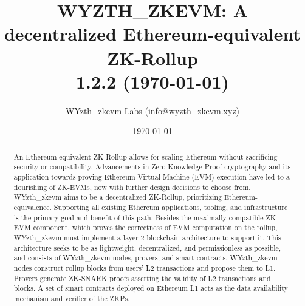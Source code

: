 \documentclass[9pt,oneside]{amsart}
\date{\today}
\title[WYZTH_ZKEVM: A decentralized Ethereum-equivalent ZK-Rollup\\ \smaller
\textbf{{1.2.2}}]{WYZTH_ZKEVM: A decentralized Ethereum-equivalent ZK-Rollup \\ \smaller \textbf{{1.2.2 (\today)}}}
\author{WYzth_zkevm Labs (info@wyzth_zkevm.xyz)}
\begin{document}
\pagecolor{pagecolor}

\begin{abstract}
An Ethereum-equivalent ZK-Rollup allows for scaling Ethereum without sacrificing security or compatibility. Advancements in Zero-Knowledge Proof cryptography and its application towards proving Ethereum Virtual Machine (EVM) execution have led to a flourishing of ZK-EVMs, now with further design decisions to choose from. WYzth_zkevm aims to be a decentralized ZK-Rollup, prioritizing Ethereum-equivalence. Supporting all existing Ethereum applications, tooling, and infrastructure is the primary goal and benefit of this path. Besides the maximally compatible ZK-EVM component, which proves the correctness of EVM computation on the rollup, WYzth_zkevm must implement a layer-2 blockchain architecture to support it. This architecture seeks to be as lightweight, decentralized, and permissionless as possible, and consists of WYzth_zkevm nodes, provers, and smart contracts. WYzth_zkevm nodes construct rollup blocks from users' L2 transactions and propose them to L1. Provers generate ZK-SNARK proofs asserting the validity of L2 transactions and blocks. A set of smart contracts deployed on Ethereum L1 acts as the data availability mechanism and verifier of the ZKPs.

\end{abstract}

\maketitle
\end{document}
